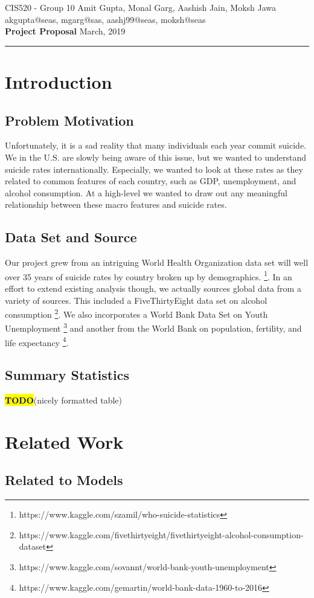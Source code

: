 \documentclass{article}
\makeatletter
\newcommand{\MyName}{Amit Gupta, Monal Garg, Aashish Jain, Moksh Jawa}
\newcommand{\MyPennKey}{akgupta@seas, mgarg@sas, aashj99@seas, moksh@seas}
\newcommand{\Class}{CIS520}
\newcommand{\TODO}{\textcolor{red}{\textbf{\hl{TODO}}}}
\newcommand{\PrintFirstHeader}{
  \Large{\Class} - \large{Group 10} \hfill {\Large{\MyName}}
  \\
   \vspace{5pt} \hfill \normalsize{\MyPennKey}
  \\
  {\LARGE{\textbf{Project Proposal}}}  \hfill {\Large{March, 2019}}

  \rule{\textwidth}{0.4pt}}
\makeatother
\begin{document}
\thispagestyle{firstpage}
\PrintFirstHeader{}

\begin{multicols}{2}

\section{Introduction}
\subsection{Problem Motivation} Unfortunately, it is a sad reality that many individuals each year commit suicide. We in the U.S. are slowly being aware of this issue, but we wanted to understand suicide rates internationally. Especially, we wanted to look at these rates as they related to common features of each country, such as GDP, unemployment, and alcohol consumption. At a high-level we wanted to draw out any meaningful relationship between these macro features and suicide rates.
\subsection{Data Set and Source} Our project grew from an intriguing 
World Health Organization data set will well over 35 years of suicide rates by country broken up by demographics.  \footnote{https://www.kaggle.com/szamil/who-suicide-statistics}. In an effort to extend existing analysis though, we actually sources global data from a variety of sources. This included a FiveThirtyEight data set on alcohol consumption \footnote{https://www.kaggle.com/fivethirtyeight/fivethirtyeight-alcohol-consumption-dataset}. We also incorporates a World Bank Data Set on Youth Unemployment \footnote{https://www.kaggle.com/sovannt/world-bank-youth-unemployment} and another from the World Bank on population, fertility, and life expectancy \footnote{https://www.kaggle.com/gemartin/world-bank-data-1960-to-2016}.
\subsection{Summary Statistics} \TODO (nicely formatted table)


\section{Related Work}
\subsection{Related to Models} 


\end{multicols}
\end{document}
